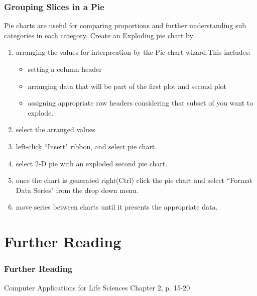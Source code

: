 \documentclass[12pt]{beamer}
\begin{document}
	\begin{frame}
		\frametitle{Grouping Slices in a Pie}
		Pie charts are useful for comparing proportions and further understanding sub categories in each category. 
		Create an Exploding pie chart by
		\begin{enumerate}
			\item arranging the values for interpreation by the Pie chart wizard.This includes:
				\begin{itemize}
					\item setting a column header 
					\item arranging data that will be part of the first plot and second plot
					\item assigning appropriate row headers considering that subset of you want to explode.
				\end{itemize}
		\item select the arranged values
		\item left-click ``Insert" ribbon, and select pie chart.
		\item select 2-D pie with an exploded second pie chart.
		\item once the chart is generated right(Ctrl) click the pie chart and select ``Format Data Series" from the drop down menu.
		\item move series between charts until it presents the appropriate data. 
	\end{enumerate}
	\end{frame}

\section{Further Reading}
	\begin{frame}
		\frametitle{Further Reading}
		Computer Applications for Life Sciences Chapter 2, p. 15-20
	\end{frame}
\end{document}

